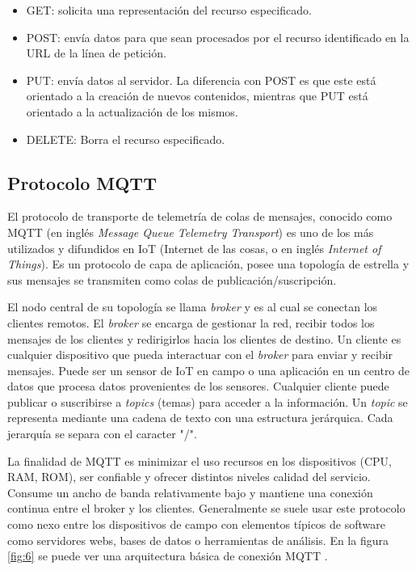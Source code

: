 \begin{itemize}
	\item GET: solicita una representación del recurso especificado.
	\item POST: envía datos para que sean procesados por el recurso identificado en la URL de la línea de petición.
	\item PUT: envía datos al servidor. La diferencia con POST es que este está orientado a la creación de nuevos contenidos, mientras que PUT está orientado a la actualización de los mismos.
	\item DELETE: Borra el recurso especificado.
\end{itemize}

\subsection{Protocolo MQTT}

El protocolo de transporte de telemetría de colas de mensajes, conocido como MQTT (en inglés \textit{Message Queue Telemetry Transport}) es uno de los más utilizados y difundidos en IoT (Internet de las cosas, o en inglés \textit{Internet of Things}). Es un protocolo de capa de aplicación, posee una topología de estrella y sus mensajes se transmiten como colas de publicación/suscripción.

El nodo central de su topología se llama \textit{broker} y es al cual se conectan los clientes remotos. El \textit{broker} se encarga de gestionar la red, recibir todos los mensajes de los clientes y redirigirlos hacia los clientes de destino. Un cliente es cualquier dispositivo que pueda interactuar con el \textit{broker} para enviar y recibir mensajes. Puede ser un sensor de IoT en campo o una aplicación en un centro de datos que procesa datos provenientes de los sensores. Cualquier cliente puede publicar o suscribirse a \textit{topics} (temas) para acceder a la información. Un \textit{topic} se representa mediante una cadena de texto con una estructura jerárquica. Cada jerarquía se separa con el caracter "/".

La finalidad de MQTT es minimizar el uso recursos en los dispositivos (CPU, RAM, ROM), ser confiable y ofrecer distintos niveles calidad del servicio. Consume un ancho de banda relativamente bajo y mantiene una conexión continua entre el broker y los clientes. Generalmente se suele usar este protocolo como nexo entre los dispositivos de campo con elementos típicos de software como servidores webs, bases de datos o herramientas de análisis. En la figura \ref{fig:6} se puede ver una arquitectura básica de conexión MQTT \citep{10}.

